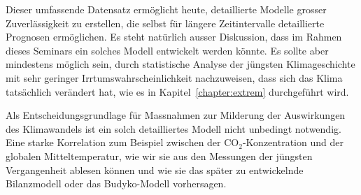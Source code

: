 Dieser umfassende Datensatz ermöglicht heute, detaillierte Modelle
grosser Zuverlässigkeit zu erstellen, die selbst für längere Zeitintervalle
detaillierte Prognosen ermöglichen.
Es steht natürlich ausser Diskussion, dass im Rahmen dieses Seminars
ein solches Modell entwickelt werden könnte.
Es sollte aber mindestens möglich sein, durch statistische Analyse der
jüngsten Klimageschichte mit sehr geringer Irrtumswahrscheinlichkeit
nachzuweisen, dass sich das Klima tatsächlich verändert hat, wie es
in Kapitel~\ref{chapter:extrem} durchgeführt wird.

Als Entscheidungsgrundlage für Massnahmen zur Milderung der Auswirkungen
des Klimawandels ist ein solch detailliertes Modell nicht unbedingt notwendig.
Eine starke Korrelation zum Beispiel zwischen der $\text{CO}_2$-Konzentration
und der globalen Mitteltemperatur, wie wir sie aus den Messungen der
jüngsten Vergangenheit ablesen können und wie sie das später zu entwickelnde
Bilanzmodell oder das Budyko-Modell vorhersagen.








